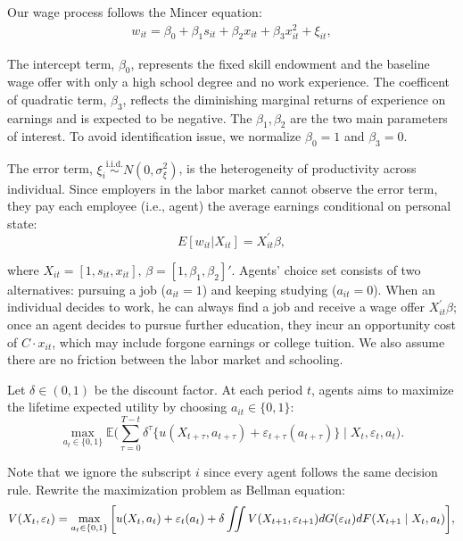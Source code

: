 \documentclass[a4paper, 12pt]{article}
\begin{document}
Our wage process follows the Mincer equation:
\begin{align}
w_{it}= \beta_0+\beta_1 s_{it}+\beta_2 x_{it} + \beta_3 x^2_{it} +  \xi_{it},
\label{mincer}
\end{align}


The intercept term, $\beta_0$, represents the fixed skill endowment and the baseline wage offer with only a high school degree and no work experience.
The coefficent of quadratic term, $\beta_3$, reflects the diminishing marginal returns of experience on earnings and is expected to be negative.
The $\beta_1, \beta_2$ are the two main parameters of interest. To avoid identification issue, we normalize $\beta_0 = 1$ and $\beta_3=0$.

The error term, $\xi_{i} \overset{\text{i.i.d.}}{\sim} N(0, \sigma^2_{\xi})$, is the heterogeneity of productivity across individual. 
Since employers in the labor market cannot observe the error term, they pay each employee (i.e., agent) the average earnings conditional on personal state:
\begin{equation}
E[w_{it}|X_{it}] = X_{it}^{\prime}\beta,
\end{equation}

where $X_{it}=[1, s_{it}, x_{it}],\,\beta=[1, \beta_1, \beta_2]'$.
Agents' choice set consists of two alternatives: pursuing a job ($a_{it} = 1$) and keeping studying ($a_{it} = 0$). 
When an individual decides to work, he can always find a job and receive a wage offer \(X_{it}^{\prime}\beta\); 
once an agent decides to pursue further education, they incur an opportunity cost of $C\cdot x_{it}$, 
which may include forgone earnings or college tuition.
We also assume there are no friction between the labor market and schooling.

Let $\delta \in (0,1)$ be the discount factor. At each period $t$, agents aims to maximize the lifetime expected utility by choosing $a_{it}\in\{0,1\}$:
\begin{equation}
\max_{a_t \in \{0,1\}}\mathbb{E} \bigg(  \sum_{\tau=0}^{T-t} \delta^{\tau} \{u(X_{t+\tau}, a_{t+\tau}) + \varepsilon_{t+\tau}(a_{t+\tau})\} \mid  X_{t},\varepsilon_t, a_{t} \bigg).
\label{bellman_eq}
\end{equation}

Note that we ignore the subscript $i$ since every agent follows the same decision rule. Rewrite the maximization problem as Bellman equation:
\begin{equation}
\small
V(X_{t}, \varepsilon_t) = \max_{a_{t} \in \{0,1\}} \bigg[ u( X_{t}, a_t) +  \varepsilon_{t}(a_{t}) + \delta \iint V(X_{t+1}, \varepsilon_{t+1})dG(\varepsilon_{it}) dF(X_{t+1} \mid X_{t},a_{t})\bigg],
\end{equation}
\end{document}
